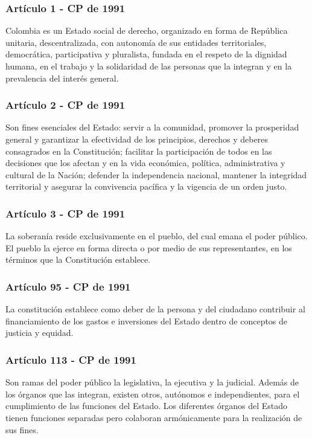 \begin{frame}
  \frametitle{Art\'iculo 1 - CP de 1991}
  Colombia es un Estado social de derecho, organizado en forma de Rep\'ublica unitaria, descentralizada, con autonom\'ia de sus entidades territoriales, democr\'atica, participativa y pluralista, fundada en el respeto de la dignidad humana, en el trabajo y la solidaridad de las personas que la integran y en la prevalencia del inter\'es general.
\end{frame}

\begin{frame}
  \frametitle{Art\'iculo 2 - CP de 1991}
  Son fines esenciales del Estado: servir a la comunidad, promover la prosperidad general y garantizar la efectividad de los principios, derechos y deberes consagrados en la Constituci\'on; facilitar la participaci\'on de todos en las decisiones que los afectan y en la vida econ\'omica, pol\'itica, administrativa y cultural de la Naci\'on; defender la independencia nacional, mantener la integridad territorial y asegurar la convivencia pac\'ifica y la vigencia de un orden justo.
\end{frame}

\begin{frame}
  \frametitle{Art\'iculo 3 - CP de 1991}
  La soberan\'ia reside exclusivamente en el pueblo, del cual emana el poder p\'ublico. El pueblo la ejerce en forma directa o por medio de sus representantes, en los t\'erminos que la Constituci\'on establece.
\end{frame}

\begin{frame}
  \frametitle{Art\'iculo 95 - CP de 1991}
  La constituci\'on establece como deber de la persona y del ciudadano contribuir al financiamiento de los gastos e inversiones del Estado dentro de conceptos de justicia y equidad.
\end{frame}

\begin{frame}
  \frametitle{Art\'iculo 113 - CP de 1991}
  Son ramas del poder p\'ublico la legislativa, la ejecutiva y la judicial. Adem\'as de los \'organos que las integran, existen otros, aut\'onomos e independientes, para el cumplimiento de las funciones del Estado. Los diferentes \'organos del Estado tienen funciones separadas pero colaboran arm\'onicamente para la realizaci\'on de sus fines.
\end{frame}

